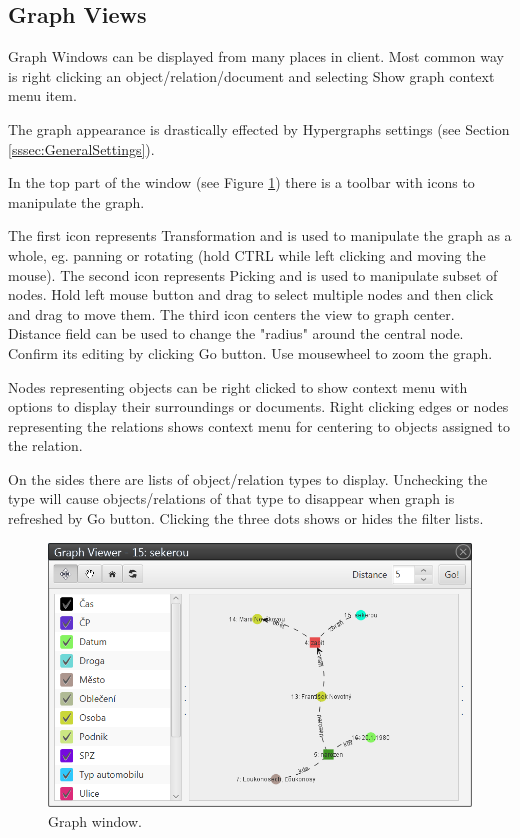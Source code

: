 \subsection{Graph Views}
\label{ssec:Graphs}

Graph Windows can be displayed from many places in \textan{} client. Most
common way is right clicking an object/relation/document and selecting Show
graph context menu item.

The graph appearance is drastically effected by Hypergraphs settings (see
Section \ref{sssec:GeneralSettings}).

In the top part of the window (see Figure \ref{fig:Graph}) there is a toolbar
with icons to manipulate the graph.

The first icon represents Transformation and is used to manipulate the graph as a whole, eg. panning or rotating (hold CTRL while left clicking and moving the
mouse). The second icon represents Picking and is used to manipulate subset of
nodes. Hold left mouse button and drag to select multiple nodes and then click
and drag to move them. The third icon centers the view to graph center.
Distance field can be used to change the "radius" around the central node.
Confirm its editing by clicking Go button. Use mousewheel to zoom the graph.

Nodes representing objects can be right clicked to show context menu with
options to display their surroundings or documents. Right clicking edges or
nodes representing the relations shows context menu for centering to objects
assigned to the relation.

On the sides there are lists of object/relation types to display. Unchecking
the type will cause objects/relations of that type to disappear when graph is refreshed by Go button. Clicking the three dots shows or hides the filter
lists.

\begin{figure}[!htb]
        \centering
        \includegraphics[width=\textwidth]{Images/graph}
        \caption{Graph window.}
        \label{fig:Graph}
\end{figure}

